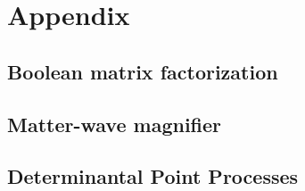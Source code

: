 \documentclass[twoside]{article}
\begin{document}
\section{Appendix} \label{sec:appendix}

\subsection{Boolean matrix factorization}


\subsection{Matter-wave magnifier} \label{sec:mwm}

\subsection{Determinantal Point Processes}
 



\subsection{}



\newpage


\end{document}
